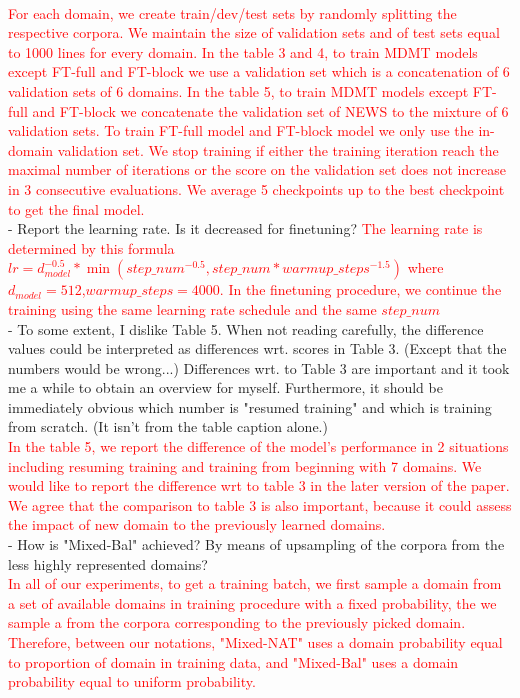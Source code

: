 \documentclass[12pt,times,a4paper,twoside]{article}
\theoremstyle{definition}
\begin{document}
\\
\textcolor{red}{For each domain, we create train/dev/test sets by randomly splitting the respective corpora. We maintain the size of validation sets and of test sets equal to 1000 lines for every domain. In the table 3 and 4, to train MDMT models except FT-full and FT-block we use a validation set which is a concatenation of 6 validation sets of 6 domains. In the table 5, to train MDMT models except FT-full and FT-block we concatenate the validation set of NEWS to the mixture of 6 validation sets. To train FT-full model and FT-block model we only use the in-domain validation set. We stop training if either the training iteration reach the maximal number of iterations or the score on the validation set does not increase in 3 consecutive evaluations. We average 5 checkpoints up to the best checkpoint to get the final model.}
\\
- Report the learning rate. Is it decreased for finetuning?
\textcolor{red}{The learning rate is determined by this formula $lr = d_{model}^{-0.5}*\min(step\_num^{-0.5},step\_num * warmup\_steps^{-1.5})$ where $d_{model}=512$,$warmup\_steps=4000$. In the finetuning procedure, we continue the training using the same learning rate schedule and the same $step\_num$}
\\
- To some extent, I dislike Table 5. When not reading carefully, the
difference values could be interpreted as differences wrt. scores in Table 3. (Except that the numbers would be wrong...) Differences wrt. to Table 3 are important and it took me a while to obtain an overview for myself. Furthermore, it should be immediately obvious which number is "resumed training" and which is training from scratch. (It isn't from the table caption alone.)
\\
\textcolor{red}{In the table 5, we report the difference of the model's performance in 2 situations including resuming training and training from beginning with 7 domains. We would like to report the difference wrt to table 3 in the later version of the paper. We agree that the comparison to table 3 is also important, because it could assess the impact of new domain to the previously learned domains.}
\\
- How is "Mixed-Bal" achieved? By means of upsampling of the corpora from the less highly represented domains?
\\
\textcolor{red}{In all of our experiments, to get a training batch, we first sample a domain from a set of available domains in training procedure with a fixed probability, the we sample a from the corpora corresponding to the previously picked domain. Therefore, between our notations, "Mixed-NAT" uses a domain probability equal to proportion of domain in training data, and "Mixed-Bal" uses a domain probability equal to uniform probability.}
\end{document}
